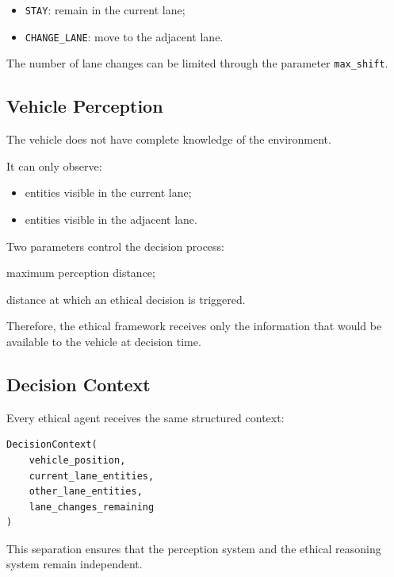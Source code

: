 \documentclass[10pt,a4paper]{article}
\begin{document}
\begin{itemize}
    \item \texttt{STAY}: remain in the current lane;
    \item \texttt{CHANGE\_LANE}: move to the adjacent lane.
\end{itemize}

The number of lane changes can be limited through the parameter
\texttt{max\_shift}.


\subsection{Vehicle Perception}

The vehicle does not have complete knowledge of the environment.

It can only observe:

\begin{itemize}
    \item entities visible in the current lane;
    \item entities visible in the adjacent lane.
\end{itemize}

Two parameters control the decision process:

\begin{description}[leftmargin=3.5cm]
    \item[\texttt{vision\_distance}] maximum perception distance;
    \item[\texttt{decision\_distance}] distance at which an ethical
    decision is triggered.
\end{description}

Therefore, the ethical framework receives only the information that
would be available to the vehicle at decision time.


\subsection{Decision Context}

Every ethical agent receives the same structured context:

\begin{verbatim}
DecisionContext(
    vehicle_position,
    current_lane_entities,
    other_lane_entities,
    lane_changes_remaining
)
\end{verbatim}

This separation ensures that the perception system and the ethical
reasoning system remain independent.
\end{document}
